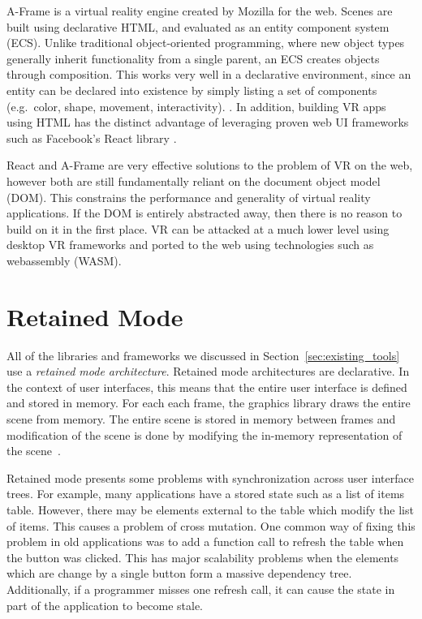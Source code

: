 \documentclass[conference,12pt]{IEEEtran}
\begin{document}
A-Frame is a virtual reality engine created by Mozilla for the web. Scenes are
built using declarative HTML, and evaluated as an entity component system (ECS).
Unlike traditional object-oriented programming, where new object types generally
inherit functionality from a single parent, an ECS creates objects through
composition. This works very well in a declarative environment, since an entity
can be declared into existence by simply listing a set of components (e.g.\
color, shape, movement, interactivity).
\cite{Mozilla-Hacks:2016:Building-A-Frame}. In addition, building VR apps using
HTML has the distinct advantage of leveraging proven web UI frameworks such as
Facebook's React library \cite{Ngo:2017:AFrame:React}.

React and A-Frame are very effective solutions to the problem of VR on the web,
however both are still fundamentally reliant on the document object model (DOM).
This constrains the performance and generality of virtual reality applications.
If the DOM is entirely abstracted away, then there is no reason to build on it
in the first place. VR can be attacked at a much lower level using desktop VR
frameworks and ported to the web using technologies such as webassembly (WASM).

\section{Retained Mode}\label{sec:retained-mode}

All of the libraries and frameworks we discussed in
Section~\ref{sec:existing_tools} use a \textit{retained mode architecture}.
Retained mode architectures are declarative. In the context of user interfaces,
this means that the entire user interface is defined and stored in memory. For
each each frame, the graphics library draws the entire scene from memory. The
entire scene is stored in memory between frames and modification of the scene is
done by modifying the in-memory representation of the
scene~\cite{Microsoft:Retained-vs-Immediate}.

Retained mode presents some problems with synchronization across user interface
trees. For example, many applications have a stored state such as a list of
items table. However, there may be elements external to the table which modify
the list of items. This causes a problem of cross mutation. One common way of
fixing this problem in old applications was to add a function call to refresh
the table when the button was clicked. This has major scalability problems when
the elements which are change by a single button form a massive dependency tree.
Additionally, if a programmer misses one refresh call, it can cause the state in
part of the application to become stale.
\end{document}
